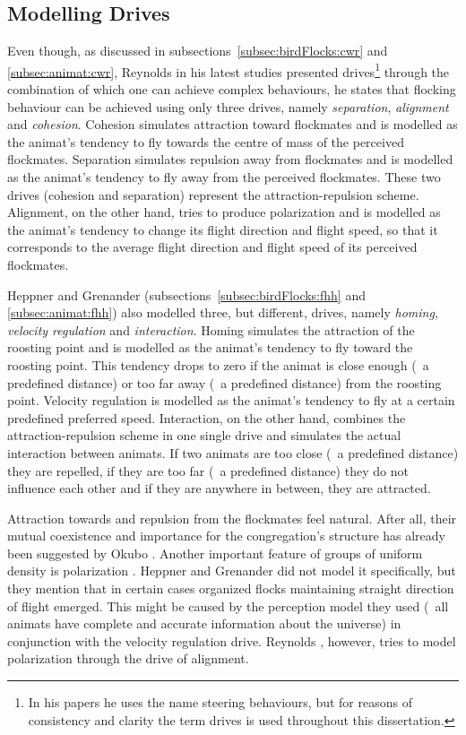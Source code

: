 \subsection{Modelling Drives}
Even though, as discussed in subsections~\ref{subsec:birdFlocks:cwr} and \ref{subsec:animat:cwr}, Reynolds in his latest studies \cite{reynolds:1999,reynolds:2000} presented drives\footnote{In his papers he uses the name steering behaviours, but for reasons of consistency and clarity the term drives is used throughout this dissertation.} through the combination of which one can achieve complex behaviours, he states that flocking behaviour can be achieved using only three drives, namely \emph{separation}, \emph{alignment} and \emph{cohesion}. Cohesion simulates attraction toward flockmates and is modelled as the animat's tendency to fly towards the centre of mass of the perceived flockmates. Separation simulates repulsion away from flockmates and is modelled as the animat's tendency to fly away from the perceived flockmates. These two drives (cohesion and separation) represent the attraction-repulsion scheme. Alignment, on the other hand, tries to produce polarization and is modelled as the animat's tendency to change its flight direction and flight speed, so that it corresponds to the average flight direction and flight speed of its perceived flockmates. 

Heppner and Grenander \cite{heppner:1990} (subsections~\ref{subsec:birdFlocks:fhh} and \ref{subsec:animat:fhh}) also modelled three, but different, drives, namely \emph{homing}, \emph{velocity regulation} and \emph{interaction}. Homing simulates the attraction of the roosting point and is modelled as the animat's tendency to fly toward the roosting point. This tendency drops to zero if the animat is close enough (\ie\ a predefined distance) or too far away (\ie\ a predefined distance) from the roosting point. Velocity regulation is modelled as the animat's tendency to fly at a certain predefined preferred speed. Interaction, on the other hand, combines the attraction-repulsion scheme in one single drive and simulates the actual interaction between animats. If two animats are too close (\ie\ a predefined distance) they are repelled, if they are too far (\ie\ a predefined distance) they do not influence each other and if they are anywhere in between, they are attracted.

Attraction towards and repulsion from the flockmates feel natural. After all, their mutual coexistence and importance for the congregation's structure has already been suggested by Okubo \cite{okubo:1980}. Another important feature of groups of uniform density is polarization \cite{parrish:1997a}. Heppner and Grenander \cite{heppner:1990} did not model it specifically, but they mention that in certain cases organized flocks maintaining straight direction of flight emerged. This might be caused by the perception model they used (\ie\ all animats have complete and accurate information about the universe) in conjunction with the velocity regulation drive. Reynolds \cite{reynolds:1987}, however, tries to model polarization through the drive of alignment. 

